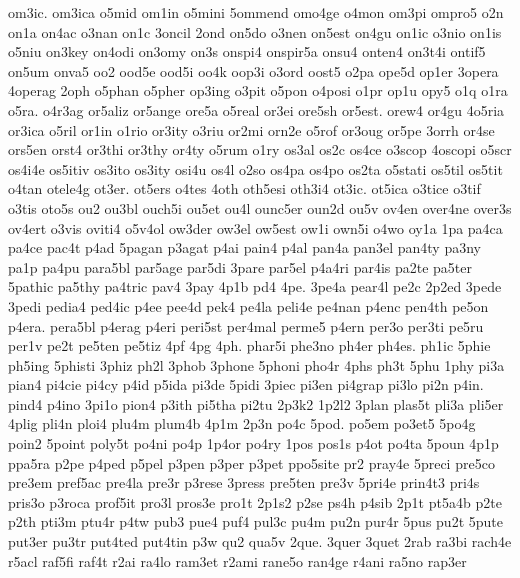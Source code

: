 {om3ic. 
om3ica 
o5mid 
om1in 
o5mini 
5ommend 
omo4ge 
o4mon 
om3pi 
ompro5 
o2n 
on1a 
on4ac 
o3nan 
on1c 
3oncil 
2ond 
on5do 
o3nen 
on5est 
on4gu 
on1ic 
o3nio 
on1is 
o5niu 
on3key 
on4odi 
on3omy 
on3s 
onspi4 
onspir5a 
onsu4 
onten4 
on3t4i 
ontif5 
on5um 
onva5 
oo2 
ood5e 
ood5i 
oo4k 
oop3i 
o3ord 
oost5 
o2pa 
ope5d 
op1er 
3opera 
4operag 
2oph 
o5phan 
o5pher 
op3ing 
o3pit 
o5pon 
o4posi 
o1pr 
op1u 
opy5 
o1q 
o1ra 
o5ra. 
o4r3ag 
or5aliz 
or5ange 
ore5a 
o5real 
or3ei 
ore5sh 
or5est. 
orew4 
or4gu 
4o5ria 
or3ica 
o5ril 
or1in 
o1rio 
or3ity 
o3riu 
or2mi 
orn2e 
o5rof 
or3oug 
or5pe 
3orrh 
or4se 
ors5en 
orst4 
or3thi 
or3thy 
or4ty 
o5rum 
o1ry 
os3al 
os2c 
os4ce 
o3scop 
4oscopi 
o5scr 
os4i4e 
os5itiv 
os3ito 
os3ity 
osi4u 
os4l 
o2so 
os4pa 
os4po 
os2ta 
o5stati 
os5til 
os5tit 
o4tan 
otele4g 
ot3er. 
ot5ers 
o4tes 
4oth 
oth5esi 
oth3i4 
ot3ic. 
ot5ica 
o3tice 
o3tif 
o3tis 
oto5s 
ou2 
ou3bl 
ouch5i 
ou5et 
ou4l 
ounc5er 
oun2d 
ou5v 
ov4en 
over4ne 
over3s 
ov4ert 
o3vis 
oviti4 
o5v4ol 
ow3der 
ow3el 
ow5est 
ow1i 
own5i 
o4wo 
oy1a 
1pa 
pa4ca 
pa4ce 
pac4t 
p4ad 
5pagan 
p3agat 
p4ai 
pain4 
p4al 
pan4a 
pan3el 
pan4ty 
pa3ny 
pa1p 
pa4pu 
para5bl 
par5age 
par5di 
3pare 
par5el 
p4a4ri 
par4is 
pa2te 
pa5ter 
5pathic 
pa5thy 
pa4tric 
pav4 
3pay 
4p1b 
pd4 
4pe. 
3pe4a 
pear4l 
pe2c 
2p2ed 
3pede 
3pedi 
pedia4 
ped4ic 
p4ee 
pee4d 
pek4 
pe4la 
peli4e 
pe4nan 
p4enc 
pen4th 
pe5on 
p4era. 
pera5bl 
p4erag 
p4eri 
peri5st 
per4mal 
perme5 
p4ern 
per3o 
per3ti 
pe5ru 
per1v 
pe2t 
pe5ten 
pe5tiz 
4pf 
4pg 
4ph. 
phar5i 
phe3no 
ph4er 
ph4es. 
ph1ic 
5phie 
ph5ing 
5phisti 
3phiz 
ph2l 
3phob 
3phone 
5phoni 
pho4r 
4phs 
ph3t 
5phu 
1phy 
pi3a 
pian4 
pi4cie 
pi4cy 
p4id 
p5ida 
pi3de 
5pidi 
3piec 
pi3en 
pi4grap 
pi3lo 
pi2n 
p4in. 
pind4 
p4ino 
3pi1o 
pion4 
p3ith 
pi5tha 
pi2tu 
2p3k2 
1p2l2 
3plan 
plas5t 
pli3a 
pli5er 
4plig 
pli4n 
ploi4 
plu4m 
plum4b 
4p1m 
2p3n 
po4c 
5pod. 
po5em 
po3et5 
5po4g 
poin2 
5point 
poly5t 
po4ni 
po4p 
1p4or 
po4ry 
1pos 
pos1s 
p4ot 
po4ta 
5poun 
4p1p 
ppa5ra 
p2pe 
p4ped 
p5pel 
p3pen 
p3per 
p3pet 
ppo5site 
pr2 
pray4e 
5preci 
pre5co 
pre3em 
pref5ac 
pre4la 
pre3r 
p3rese 
3press 
pre5ten 
pre3v 
5pri4e 
prin4t3 
pri4s 
pris3o 
p3roca 
prof5it 
pro3l 
pros3e 
pro1t 
2p1s2 
p2se 
ps4h 
p4sib 
2p1t 
pt5a4b 
p2te 
p2th 
pti3m 
ptu4r 
p4tw 
pub3 
pue4 
puf4 
pul3c 
pu4m 
pu2n 
pur4r 
5pus 
pu2t 
5pute 
put3er 
pu3tr 
put4ted 
put4tin 
p3w 
qu2 
qua5v 
2que. 
3quer 
3quet 
2rab 
ra3bi 
rach4e 
r5acl 
raf5fi 
raf4t 
r2ai 
ra4lo 
ram3et 
r2ami 
rane5o 
ran4ge 
r4ani 
ra5no 
rap3er 
}
